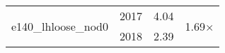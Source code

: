 \begin{table}[!ht]
{\begin{tabular}{lccc}
\multirow{2}{*}{e140\_lhloose\_nod0} & 2017 & 4.04 & \multirow{2}{*}{1.69$\times$} \\ \cline{2-3}
 & 2018 & 2.39 &  \\ \hline
\end{tabular}
}
\end{table}


